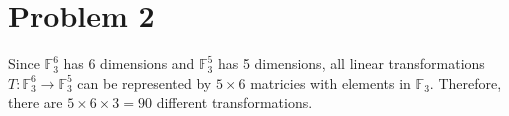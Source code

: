 \section*{Problem 2}
Since $\mathbb{F}_3^6$ has 6 dimensions and
$\mathbb{F}_3^5$ has 5 dimensions,
all linear transformations $T: \mathbb{F}_3^6 \rightarrow \mathbb{F}_3^5$
can be represented by $5 \times 6$ matricies with elements in $\mathbb{F}_3$.
Therefore, there are $5 \times 6 \times 3 = 90$ different transformations.